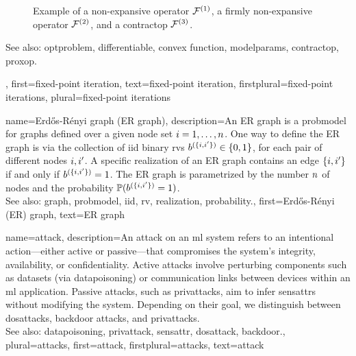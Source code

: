 {{\begin{figure}[H]
\begin{center}
			\end{center} 
			\caption{Example of a non-expansive operator $\mathcal{F}^{(1)}$, a firmly non-expansive operator $\mathcal{F}^{(2)}$, and 
				a \gls{contractop} $\mathcal{F}^{(3)}$. \label{fig_examples_nonexp_dict}}
		\end{figure} 
		See also: \gls{optproblem}, \gls{differentiable}, \gls{convex} \gls{function}, \gls{modelparams}, \gls{contractop}, \gls{proxop}.},
	first={fixed-point iteration},
	text={fixed-point iteration},
	firstplural={fixed-point iterations}, 
	plural={fixed-point iterations}
}


{name={Erd\H{o}s-R\'enyi graph (ER graph)},
	description={An ER  \gls{graph} is a \gls{probmodel} for \glspl{graph} defined over 
		a given node set $i=1, \ldots, n$. One way to define the ER \gls{graph} is 
		via the collection of \gls{iid} binary \glspl{rv} $b^{(\{i,i'\})} \in \{0,1\}$, 
		for each pair of different nodes $i, i'$. A specific \gls{realization}  
		of an ER \gls{graph} contains an edge $\{i,i'\}$ if and only if 
		$b^{(\{i,i'\})}=1$. The ER \gls{graph} is parametrized by the 
		number $n$ of nodes and the \gls{probability} $\mathbb{P}({b^{(\{i,i'\})}=1})$. 
		\\
		See also: \gls{graph}, \gls{probmodel}, \gls{iid}, \gls{rv}, \gls{realization}, \gls{probability}.},
	first={Erd\H{o}s-R\'enyi (ER) graph},
	text={ER graph}
}

{name={attack},  
	description={An attack on an \gls{ml} system refers to an intentional action—either 
		active or passive—that compromises the system's integrity, availability, or confidentiality. 
		Active attacks involve perturbing components such as \glspl{dataset} (via \gls{datapoisoning}) 
		or communication links between \glspl{device} within an \gls{ml} application. Passive attacks, 
		such as \glspl{privattack}, aim to infer \glspl{sensattr} without modifying the system. 
		Depending on their goal, we distinguish between \glspl{dosattack}, \gls{backdoor} attacks, and \glspl{privattack}.
		\\
		See also:  \gls{datapoisoning}, \gls{privattack}, \gls{sensattr}, \gls{dosattack}, \gls{backdoor}.},
	plural={attacks}, 
	first={attack},
	firstplural={attacks},
	text={attack}
}


